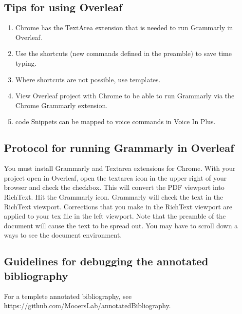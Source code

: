 \documentclass[10pt,letterpaper]{article}
\newcommand{\be}{\begin{enumerate}}
\newcommand{\ee}{\end{enumerate}}
\begin{document}
\subsection{Tips for using Overleaf}
\label{subsec:guides:overleaf}


\be
\item Chrome has the TextArea extension that is needed to run Grammarly in Overleaf.
\item Use the shortcuts (new commands defined in the preamble) to save time typing.
\item Where shortcuts are not possible, use templates.
\item View Overleaf project with Chrome to be able to run Grammarly via the Chrome Grammarly extension.
\item code Snippets can be mapped to voice commands in Voice In Plus.
\ee 


\subsection{Protocol for running Grammarly in Overleaf}
\label{subsec:guides:grammarlyInoverleaf}

You must install Grammarly and Textarea extensions for Chrome.
With your project open in Overleaf, open the textarea icon in the upper right of your browser and check the checkbox.
This will convert the PDF viewport into RichText. 
Hit the Grammarly icon. 
Grammarly will check the text in the RichText viewport.
Corrections that you make in the RichText viewport are applied to your tex file in the left viewport.
Note that the preamble of the document will cause the text to be spread out.
You may have to scroll down a ways to see the document environment.


\subsection{Guidelines for debugging the annotated bibliography} 
\label{subsec:guides:annotDebug}

For a templete annotated bibliography, see https://github.com/MooersLab/annotatedBibliography.
\end{document}
